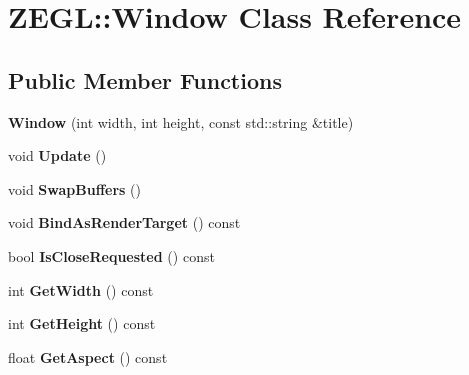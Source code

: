 \hypertarget{class_z_e_g_l_1_1_window}{}\section{Z\+E\+G\+L\+:\+:Window Class Reference}
\label{class_z_e_g_l_1_1_window}
\subsection*{Public Member Functions}
\begin{DoxyCompactItemize}
\item 
\hypertarget{class_z_e_g_l_1_1_window_a2bf7954f0cf38a7fc4c4742e4a91a190}{}{\bfseries Window} (int width, int height, const std\+::string \&title)\label{class_z_e_g_l_1_1_window_a2bf7954f0cf38a7fc4c4742e4a91a190}

\item 
\hypertarget{class_z_e_g_l_1_1_window_ab8d28dce3166c70eb5744466460795df}{}void {\bfseries Update} ()\label{class_z_e_g_l_1_1_window_ab8d28dce3166c70eb5744466460795df}

\item 
\hypertarget{class_z_e_g_l_1_1_window_abe1b83eda6980f2b9964aab08b5310ed}{}void {\bfseries Swap\+Buffers} ()\label{class_z_e_g_l_1_1_window_abe1b83eda6980f2b9964aab08b5310ed}

\item 
\hypertarget{class_z_e_g_l_1_1_window_a7b9db9583287699589b2cd8414eb8ca3}{}void {\bfseries Bind\+As\+Render\+Target} () const \label{class_z_e_g_l_1_1_window_a7b9db9583287699589b2cd8414eb8ca3}

\item 
\hypertarget{class_z_e_g_l_1_1_window_a1dfc1788b9219491978175766665ecf3}{}bool {\bfseries Is\+Close\+Requested} () const \label{class_z_e_g_l_1_1_window_a1dfc1788b9219491978175766665ecf3}

\item 
\hypertarget{class_z_e_g_l_1_1_window_a72d51a5848206c942eef6155b58c43bd}{}int {\bfseries Get\+Width} () const \label{class_z_e_g_l_1_1_window_a72d51a5848206c942eef6155b58c43bd}

\item 
\hypertarget{class_z_e_g_l_1_1_window_ad7886b325583ea1059878e822c7f080d}{}int {\bfseries Get\+Height} () const \label{class_z_e_g_l_1_1_window_ad7886b325583ea1059878e822c7f080d}

\item 
\hypertarget{class_z_e_g_l_1_1_window_a2125db36818bd9110a28658b6e8e3d85}{}float {\bfseries Get\+Aspect} () const \label{class_z_e_g_l_1_1_window_a2125db36818bd9110a28658b6e8e3d85}


\end{DoxyCompactItemize}
